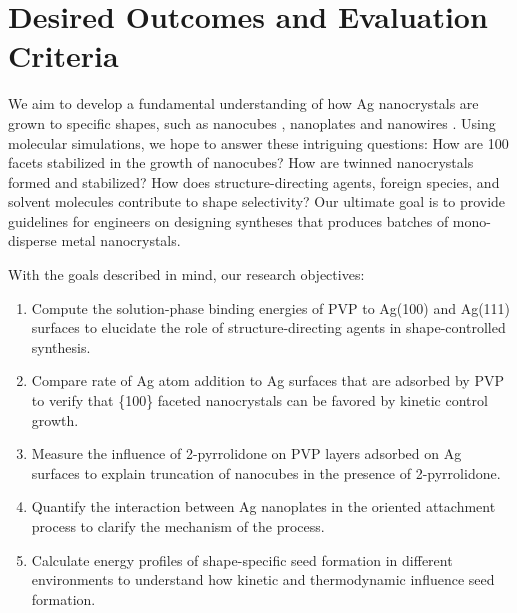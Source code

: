 \section{Desired Outcomes and Evaluation Criteria}
  
We aim to develop a fundamental understanding of how Ag nanocrystals are grown to specific shapes, such as nanocubes \cite{Im_2005}, nanoplates \cite{Lofton_2005} and nanowires \cite{Tsuji_2008}.
Using molecular simulations, we hope to answer these intriguing questions:
How are {100} facets stabilized in the growth of nanocubes?
How are twinned nanocrystals formed and stabilized?
How does structure-directing agents, foreign species, and solvent molecules contribute to shape selectivity?
Our ultimate goal is to provide guidelines for engineers on designing syntheses that produces batches of mono-disperse metal nanocrystals.

With the goals described in mind, our research objectives:
\begin{enumerate}
\item Compute the solution-phase binding energies of PVP to Ag(100) and Ag(111) surfaces to elucidate the role of structure-directing agents in shape-controlled synthesis.
\item Compare rate of Ag atom addition to Ag surfaces that are adsorbed by PVP to verify that \{100\} faceted nanocrystals can be favored by kinetic control growth.
\item Measure the influence of 2-pyrrolidone on PVP layers adsorbed on Ag surfaces to explain truncation of nanocubes in the presence of 2-pyrrolidone.
\item Quantify the interaction between Ag nanoplates in the oriented attachment process to clarify the mechanism of the process.
\item Calculate energy profiles of shape-specific seed formation in different environments to understand how kinetic and thermodynamic influence seed formation.
\end{enumerate}